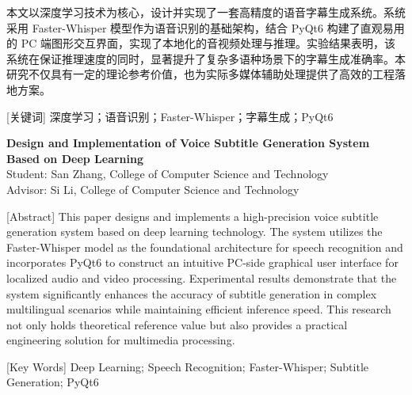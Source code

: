 \documentclass[a4paper, 12pt, twoside]{ctexart}
\begin{document}
{\songti
[摘要] 本文以深度学习技术为核心，设计并实现了一套高精度的语音字幕生成系统。系统采用 Faster-Whisper 模型作为语音识别的基础架构，结合 PyQt6 构建了直观易用的 PC 端图形交互界面，实现了本地化的音视频处理与推理。实验结果表明，该系统在保证推理速度的同时，显著提升了复杂多语种场景下的字幕生成准确率。本研究不仅具有一定的理论参考价值，也为实际多媒体辅助处理提供了高效的工程落地方案。

[关键词] 深度学习；语音识别；Faster-Whisper；字幕生成；PyQt6
}

\newpage

\begin{flushleft}
    {\bfseries Design and Implementation of Voice Subtitle Generation System Based on Deep Learning}\\[1\baselineskip]
    
    { Student: San Zhang, College of Computer Science and Technology}\\[0.5\baselineskip]
    { Advisor: Si Li, College of Computer Science and Technology}\\[1\baselineskip]

    {
    [Abstract] This paper designs and implements a high-precision voice subtitle generation system based on deep learning technology. The system utilizes the Faster-Whisper model as the foundational architecture for speech recognition and incorporates PyQt6 to construct an intuitive PC-side graphical user interface for localized audio and video processing. Experimental results demonstrate that the system significantly enhances the accuracy of subtitle generation in complex multilingual scenarios while maintaining efficient inference speed. This research not only holds theoretical reference value but also provides a practical engineering solution for multimedia processing.
    
    \vspace{0.5\baselineskip}
    [Key Words] Deep Learning; Speech Recognition; Faster-Whisper; Subtitle Generation; PyQt6
    }
\end{flushleft}

\label{EndPartOne}

\newpage
\end{document}
